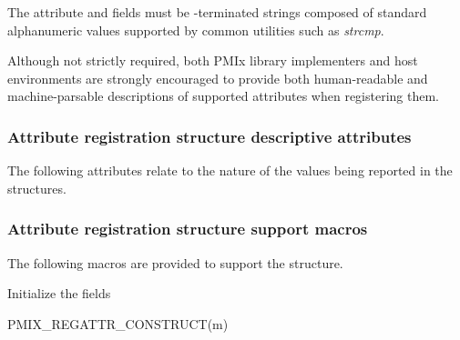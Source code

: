 The attribute  and  fields must be -terminated strings composed of standard alphanumeric values supported by common utilities such as \textit{strcmp}.

Although not strictly required, both \ac{PMIx} library implementers and host environments are strongly encouraged to provide both human-readable and machine-parsable descriptions of supported attributes when registering them.

\subsubsection{Attribute registration structure descriptive attributes}
\label{api:struct:attributes:descr}

The following attributes relate to the nature of the values being reported
in the  structures.

%
%

\subsubsection{Attribute registration structure support macros}

The following macros are provided to support the  structure.


Initialize the  fields

\cspecificstart
\begin{codepar}
PMIX_REGATTR_CONSTRUCT(m)
\end{codepar}
\cspecificend

